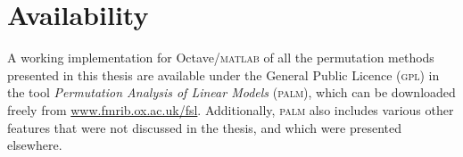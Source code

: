 \section{Availability}

A working implementation for Octave/\textsc{matlab} of all the permutation methods presented in this thesis are available under the General Public Licence (\textsc{gpl}) in the tool \emph{Permutation Analysis of Linear Models} (\textsc{palm}), which can be downloaded freely from \href{http://www.fmrib.ox.ac.uk/fsl}{www.fmrib.ox.ac.uk/fsl}. Additionally, \textsc{palm} also includes various other features that were not discussed in the thesis, and which were presented elsewhere.


